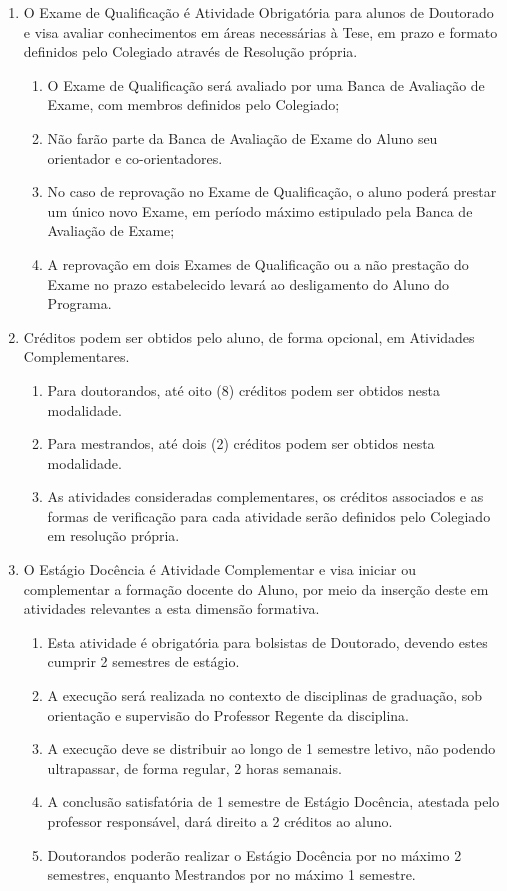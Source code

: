 \documentclass{article}
\newcommand{\grupoMenor}{Colegiado\xspace}
\begin{document}
\begin{enumerate}
	\item  O Exame de Qualificação é Atividade Obrigatória para alunos de Doutorado e visa avaliar conhecimentos em áreas necessárias à Tese, em prazo e formato definidos pelo \grupoMenor através de Resolução própria.
	\begin{enumerate}
		\item O Exame de Qualificação será avaliado por uma Banca de Avaliação de Exame, com membros definidos pelo \grupoMenor;
		\item Não farão parte da Banca de Avaliação de Exame do Aluno seu orientador e co-orientadores.
		\item No caso de reprovação no Exame de Qualificação, o aluno poderá prestar um único novo Exame, em período máximo estipulado pela Banca de Avaliação de Exame;
		\item A reprovação em dois Exames de Qualificação ou a não prestação do Exame no prazo estabelecido levará ao desligamento do Aluno do Programa.
	\end{enumerate}

	\item Créditos podem ser obtidos pelo aluno, de forma opcional, em Atividades Complementares.
	\begin{enumerate}
		\item Para doutorandos, até oito (8) créditos podem ser obtidos nesta modalidade.
		\item Para mestrandos, até dois (2) créditos podem ser obtidos nesta modalidade.
		\item As atividades consideradas complementares, os créditos associados e as formas de verificação para cada atividade serão definidos pelo \grupoMenor em resolução própria.
	\end{enumerate}

	\item O Estágio Docência é Atividade Complementar e visa iniciar ou complementar a formação docente do Aluno, por meio da inserção deste em atividades relevantes a esta dimensão formativa.
	\begin{enumerate}
		\item Esta atividade é obrigatória para bolsistas de Doutorado, devendo estes cumprir 2 semestres de estágio.
		\item A execução será realizada no contexto de disciplinas de graduação, sob orientação e supervisão do Professor Regente da disciplina.
		\item A execução deve se distribuir ao longo de 1 semestre letivo, não podendo ultrapassar, de forma regular, 2 horas semanais.
		\item A conclusão satisfatória de 1 semestre de Estágio Docência, atestada pelo professor responsável, dará direito a 2 créditos ao aluno.
		\item Doutorandos poderão realizar o Estágio Docência por no máximo 2 semestres, enquanto Mestrandos por no máximo 1 semestre.
	\end{enumerate}	

\end{enumerate}
\end{document}
